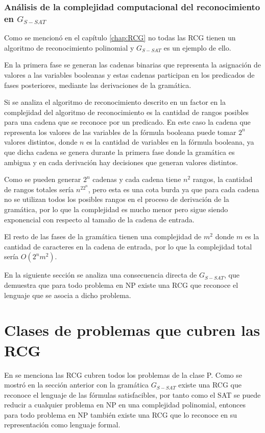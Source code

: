\documentclass[12pt]{article}
\begin{document}
\subsubsection{Análisis de la complejidad computacional del reconocimiento en $G_{S-SAT}$}

Como se mencionó en el capítulo \ref{chap:RCG} no todas las RCG tienen un algoritmo de reconocimiento polinomial
y $G_{S-SAT}$ es un ejemplo de ello.

En la primera fase se generan las cadenas binarias que representa la asignación de valores a las variables
booleanas y estas cadenas participan en los predicados de fases posteriores, mediante las derivaciones de la
gramática.

Si se analiza el algoritmo de reconocimiento descrito en \cite{mainRCGBib} un factor en la complejidad del
algoritmo de reconocimiento es la cantidad de rangos posibles para una cadena que se reconoce por un predicado.
En este caso la cadena que representa los valores de las variables de la fórmula booleana puede tomar
$2^n$ valores distintos, donde $n$ es la cantidad de variables en la fórmula booleana, ya que dicha cadena
se genera durante la primera fase donde la gramática es ambigua y en cada derivación hay decisiones que
generan valores distintos.

Como se pueden generar $2^n$ cadenas y cada cadena tiene $n^2$ rangos, la cantidad de rangos totales sería
$n^22^n$, pero esta es una cota burda ya que para cada cadena no se utilizan todos los posibles rangos en el
proceso de derivación de la gramática, por lo que la complejidad es mucho menor pero sigue siendo exponencial
con respecto al tamaño de la cadena de entrada.

El resto de las fases de la gramática tienen una complejidad de $m^2$ donde $m$
es la cantidad de caracteres en la cadena de entrada, por lo que la complejidad total sería $O(2^nm^2)$.

En la siguiente sección se analiza una consecuencia directa de $G_{S-SAT}$, que demuestra que
para todo problema en NP existe una RCG que reconoce el lenguaje que se asocia a dicho problema.
\section{Clases de problemas que cubren las RCG}

En \cite{propertiesRCGBib2} se menciona las RCG cubren todos los problemas de la clase P. Como se mostró en la sección anterior con la gramática $G_{S-SAT}$
existe una RCG que reconoce el lenguaje de las fórmulas satisfacibles, por tanto como el SAT se puede reducir
a cualquier problema en NP en una complejidad polinomial, entonces para todo problema en NP también existe una
RCG que lo reconoce en su representación como lenguaje formal.
\end{document}
